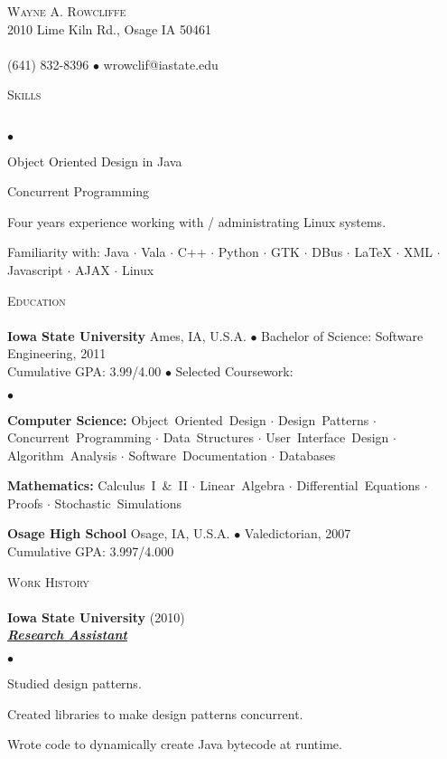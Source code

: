 \documentclass{article}
\newcommand{\lineunder} {
	\vspace*{-8pt} \\ \hspace*{-18pt} \hrulefill \\
}
\newcommand{\header}[1] {
	{\hspace*{-15pt}\vspace*{6pt} \textsc{#1}} \vspace*{-6pt} \lineunder
}
\newcommand{\employer}[3] {
	{ \textbf{#1} (#2)\\ \underline{\textbf{\emph{#3}}}\\  }
}
\newcommand{\contact}[3] {
	\vspace*{-8pt}\begin{center}{\LARGE \scshape {#1}}\\#2 \lineunder#3\end{center}\vspace*{-8pt}
}
\newenvironment{achievements} {
	\begin{list}{$\bullet$}
		{\topsep 0pt \itemsep -2pt}
	}{
		\vspace*{4pt}\end{list}
	}
\newcommand{\schoolwithcourses}[4]{
	\textbf{#1} #2 $\bullet$ #3\\
	#4 $\bullet$  Selected Coursework:\\
	\vspace*{5pt}
}
\newcommand{\school}[4] {
	\textbf{#1} #2 $\bullet$ #3\\
	#4 \\
	\vspace*{5pt}
}
\newcommand{\area}[1] {\textbf{#1:}}
\newcommand{\subject}[1] {\mbox{#1} $\cdot$}
\newcommand{\lastsubject}[1] {\mbox{#1}}
\begin{document}
\small
\smallskip
\vspace*{-44pt}

\contact{Wayne A. Rowcliffe}
{2010 Lime Kiln Rd., Osage IA 50461}
{(641) 832-8396 $\bullet$ wrowclif@iastate.edu}%

\header{Skills}

	\begin{achievements}
		\item{Object Oriented Design in Java}
		\item{Concurrent Programming}
		\item{Four years experience working with / administrating Linux systems.}
		\item{Familiarity with:
			\subject{Java}
			\subject{Vala}
			\subject{C++}
			\subject{Python}
			\subject{GTK}
			\subject{DBus}
			\subject{\LaTeX{}}
			\subject{XML}
			\subject{Javascript}
			\subject{AJAX}
			\lastsubject{Linux}
		}

	\end{achievements}

\header{Education}

	\schoolwithcourses{Iowa State University}{Ames, IA, U.S.A.}{Bachelor of Science: Software Engineering, 2011}
	{Cumulative GPA: 3.99/4.00}
		\begin{achievements}
			\item{
				\area{Computer Science}
				\subject{Object Oriented Design}
				\subject{Design Patterns}
				\subject{Concurrent Programming}
				\subject{Data Structures}
				\subject{User Interface Design}
				\subject{Algorithm Analysis}
				\subject{Software Documentation}
				\lastsubject{Databases}
			}
			\item{
				\area{Mathematics}
				\subject{Calculus I \& II}
				\subject{Linear Algebra}
				\subject{Differential Equations}
				\subject{Proofs}
				\lastsubject{Stochastic Simulations}
			}
		\end{achievements}

	\school{Osage High School}{Osage, IA, U.S.A.}{Valedictorian, 2007}
	{Cumulative GPA: 3.997/4.000}

\header{Work History}

	\employer{Iowa State University}{2010}{Research Assistant}
		\begin{achievements}
			\item{Studied design patterns.}
			\item{Created libraries to make design patterns concurrent.}
			\item{Wrote code to dynamically create Java bytecode at runtime.}
		\end{achievements}
\end{document}
